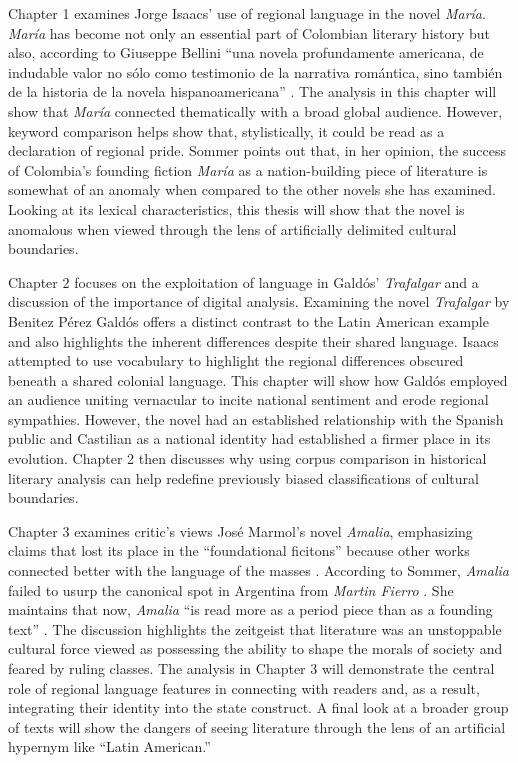 \documentclass[12pt]{report}
\begin{document}
Chapter 1 examines Jorge Isaacs' use of regional language in the novel \textit{María}. 
\textit{María} has become not only an essential part of Colombian literary history but also, according to Giuseppe Bellini \enquote{una novela profundamente americana, de indudable valor no sólo como testimonio de la narrativa romántica, sino también de la historia de la novela hispanoamericana} \autocite[290]{Bellini1997}\nocite{Isaacs2012}. 
The analysis in this chapter will show that \textit{María} connected thematically with a broad global audience. 
However, keyword comparison helps show that, stylistically, it could be read as a declaration of regional pride. 
Sommer points out that, in her opinion, the success of Colombia's founding fiction \textit{María} as a nation-building piece of literature is somewhat of an anomaly when compared to the other novels she has examined. 
Looking at its lexical characteristics, this thesis will show that the novel is anomalous when viewed through the lens of artificially delimited cultural boundaries.

Chapter 2 focuses on the exploitation of language in Galdós' \textit{Trafalgar} and a discussion of the importance of digital analysis. 
Examining the novel \textit{Trafalgar} by Benitez Pérez Galdós offers a distinct contrast to the Latin American example and also highlights the inherent differences despite their shared language.
Isaacs attempted to use vocabulary to highlight the regional differences obscured beneath a shared colonial language. 
This chapter will show how Galdós employed an audience uniting vernacular to incite national sentiment and erode regional sympathies. 
However, the novel had an established relationship with the Spanish public and Castilian as a national identity had established a firmer place in its evolution.
Chapter 2 then discusses why using corpus comparison in historical literary analysis can help redefine previously biased classifications of cultural boundaries.

Chapter 3 examines critic's views José Marmol's novel \textit{Amalia}, emphasizing claims that lost its place in the \enquote{foundational ficitons} because other works connected better with the language of the masses \autocite{Sommer1991}. 
According to Sommer, \textit{Amalia} failed to usurp the canonical spot in Argentina from \textit{Martin Fierro} \autocite*[111]{Sommer1991}.
She maintains that now, \textit{Amalia} \enquote{is read more as a period piece than as a founding text} \cite[111]{Sommer1991}. 
The discussion highlights the zeitgeist that literature was an unstoppable cultural force viewed as possessing the ability to shape the morals of society and feared by ruling classes. 
The analysis in Chapter 3 will demonstrate the central role of regional language features in connecting with readers and, as a result, integrating their identity into the state construct.
A final look at a broader group of texts will show the dangers of seeing literature through the lens of an artificial hypernym like \enquote{Latin American.}
\end{document}
